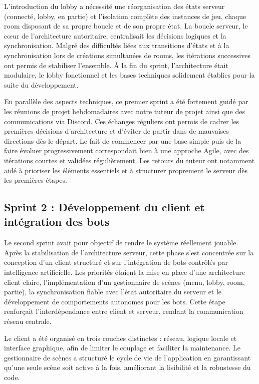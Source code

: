 \documentclass[a4paper, 11pt]{article}
\begin{document}
L’introduction du lobby a nécessité une réorganisation des états serveur (connecté, lobby, en partie) et l’isolation complète des instances de jeu, chaque room disposant de sa propre boucle et de son propre état. La boucle serveur, le c\oe ur de l’architecture autoritaire, centralisait les décisions logiques et la synchronisation. Malgré des difficultés liées aux transitions d’états et à la synchronisation lors de créations simultanées de rooms, les itérations successives ont permis de stabiliser l’ensemble. À la fin du sprint, l’architecture était modulaire, le lobby fonctionnel et les bases techniques solidement établies pour la suite du développement.

En parallèle des aspects techniques, ce premier sprint a été fortement guidé par les réunions de projet hebdomadaires avec notre tuteur de projet ainsi que des communications via Discord. Ces échanges réguliers ont permis de cadrer les premières décisions d’architecture et d’éviter de partir dans de mauvaises directions dès le départ. Le fait de commencer par une base simple puis de la faire évoluer progressivement correspondait bien à une approche Agile, avec des itérations courtes et validées régulièrement. Les retours du tuteur ont notamment aidé à prioriser les éléments essentiels et à structurer proprement le serveur dès les premières étapes.

\subsection{Sprint 2 : Développement du client et intégration des bots}

Le second sprint avait pour objectif de rendre le système réellement jouable. Après la stabilisation de l’architecture serveur, cette phase s’est concentrée sur la conception d’un client structuré et sur l’intégration de bots contrôlés par intelligence artificielle. Les priorités étaient la mise en place d’une architecture client claire, l’implémentation d’un gestionnaire de scènes (menu, lobby, room, partie), la synchronisation fiable avec l’état autoritaire du serveur et le développement de comportements autonomes pour les bots. Cette étape renforçait l’interdépendance entre client et serveur, rendant la communication réseau centrale.

Le client a été organisé en trois couches distinctes : réseau, logique locale et interface graphique, afin de limiter le couplage et faciliter la maintenance. Le gestionnaire de scènes a structuré le cycle de vie de l’application en garantissant qu’une seule scène soit active à la fois, améliorant la lisibilité et la robustesse du code.
\end{document}
